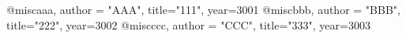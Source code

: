  @misc{aaa, author = "AAA", title="111", year=3001}
 @misc{bbb, author = "BBB", title="222", year=3002}
 @misc{ccc, author = "CCC", title="333", year=3003}
